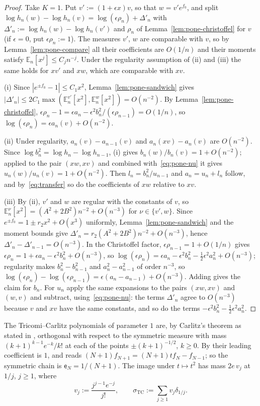 \begin{proof}
Take $K=1$. Put $v':=(1+\epsilon x)v$, so that $w=v'e^{f_0}$, and split
$\log h_n(w)-\log h_n(v)=\log(\epsilon\rho_n)+\Delta'_n$ with $\Delta'_n:=\log h_n(w)-\log h_n(v')$ and $\rho_n$ of
Lemma~\ref{lem:pone-christoffel} for $v$ (if $\epsilon=0$, put $\epsilon\rho_n:=1$). The measures $v'$, $w$ are comparable
with $v$, so by Lemma~\ref{lem:pone-compare} all their coefficients are $O(1/n)$ and their moments satisfy
$\mathbb E_n[x^j]\le C_jn^{-j}$. Under the regularity assumption of (ii) and (iii) the same holds for $xv'$ and $xw$,
which are comparable with $xv$.

(i) Since $|e^{\pm f_0}-1|\le C_1x^2$, Lemma~\ref{lem:pone-sandwich} gives $|\Delta'_n|\le2C_1\max(\mathbb E_n^{v'}[x^2],
\mathbb E_n^w[x^2])=O(n^{-2})$. By Lemma~\ref{lem:pone-christoffel}, $\epsilon\rho_n-1=\epsilon a_n-\epsilon^2b_n^2/(\epsilon\rho_{n-1})=O(1/n)$,
so $\log(\epsilon\rho_n)=\epsilon a_n(v)+O(n^{-2})$.

(ii) Under regularity, $a_n(v)-a_{n-1}(v)$ and $a_n(xv)-a_n(v)$ are $O(n^{-2})$. Since $\log b_n^2=\log h_n-\log h_{n-1}$,
(i) gives $b_n(w)/b_n(v)=1+O(n^{-2})$; applied to the pair $(xw,xv)$ and combined with~\eqref{eq:pone-nu} it gives
$u_n(w)/u_n(v)=1+O(n^{-2})$. Then $l_n=b_n^2/u_{n-1}$ and $a_n=u_n+l_n$ follow, and by~\eqref{eq:transfer} so do the
coefficients of $xw$ relative to $xv$.

(iii) By (ii), $v'$ and $w$ are regular with the constants of $v$, so $\mathbb E_n^\nu[x^2]=(A^2+2B^2)n^{-2}+O(n^{-3})$ for
$\nu\in\{v',w\}$. Since $e^{\pm f_0}=1\pm r_2x^2+O(x^3)$ uniformly, Lemma~\ref{lem:pone-sandwich} and the moment bounds
give $\Delta'_n=r_2(A^2+2B^2)n^{-2}+O(n^{-3})$, hence $\Delta'_n-\Delta'_{n-1}=O(n^{-3})$. In the Christoffel factor,
$\epsilon\rho_{n-1}=1+O(1/n)$ gives $\epsilon\rho_n=1+\epsilon a_n-\epsilon^2b_n^2+O(n^{-3})$, so
$\log(\epsilon\rho_n)=\epsilon a_n-\epsilon^2b_n^2-\frac12\epsilon^2a_n^2+O(n^{-3})$; regularity makes
$b_n^2-b_{n-1}^2$ and $a_n^2-a_{n-1}^2$ of order $n^{-3}$, so $\log(\epsilon\rho_n)-\log(\epsilon\rho_{n-1})=
\epsilon(a_n-a_{n-1})+O(n^{-3})$. Adding gives the claim for $b_n$. For $u_n$ apply the same expansions to the pairs
$(xw,xv)$ and $(w,v)$ and subtract, using~\eqref{eq:pone-nu}: the terms $\Delta'_n$ agree to $O(n^{-3})$ because $v$ and
$xv$ have the same constants, and so do the terms $-\epsilon^2b_n^2-\frac12\epsilon^2a_n^2$.
\end{proof}

The Tricomi--Carlitz polynomials of parameter $1$ are, by Carlitz's theorem as stated in \cite[(1.4)--(1.5)]{WLXZ},
orthogonal with respect to the symmetric measure with mass $(k+1)^{k-1}e^{-k}/k!$ at each of the points
$\pm(k+1)^{-1/2}$, $k\ge0$. By \cite[(1.9)]{WLXZ} their leading coefficient is $1$, and \cite[(1.6)]{WLXZ} reads
$(N+1)f_{N+1}=(N+1)tf_N-f_{N-1}$; so the symmetric chain is $\mathsf e_N=1/(N+1)$. The image under $t\mapsto t^2$ has
mass $2e\,v_j$ at $1/j$, $j\ge1$, where
\[
  v_j:=\frac{j^{j-1}e^{-j}}{j!},\qquad \sigma_{\mathrm{TC}}:=\sum_{j\ge1}v_j\delta_{1/j}.
\]

